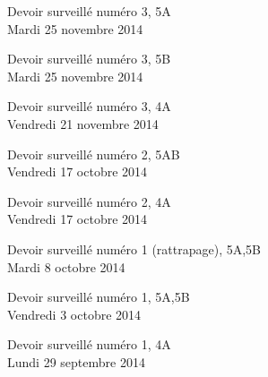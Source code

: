 \documentclass[a4paper,10pt]{article}
\begin{document}
\begin{feuilleDS}{Devoir surveillé numéro 3, 5A\\ \small Mardi 25 novembre 2014}
\end{feuilleDS}

\begin{feuilleDS}{Devoir surveillé numéro 3, 5B\\ \small Mardi 25 novembre 2014}
\end{feuilleDS}

\begin{feuilleDS}{Devoir surveillé numéro 3, 4A\\ \small Vendredi 21 novembre 2014}
\end{feuilleDS}

\begin{feuilleDS}{Devoir surveillé numéro 2, 5AB\\ \small Vendredi 17 octobre 2014}  %
\end{feuilleDS}

\begin{feuilleDS}{Devoir surveillé numéro 2, 4A\\ \small Vendredi 17 octobre 2014}
\end{feuilleDS}


\begin{feuilleDS}{Devoir surveillé numéro 1 (rattrapage), 5A,5B\\ \small Mardi 8 octobre 2014}
\end{feuilleDS}


\begin{feuilleDS}{Devoir surveillé numéro 1, 5A,5B\\ \small Vendredi 3 octobre 2014}
\end{feuilleDS}



\begin{feuilleDS}{Devoir surveillé numéro 1, 4A\\ \small Lundi 29 septembre 2014}

\end{feuilleDS}
\end{document}
